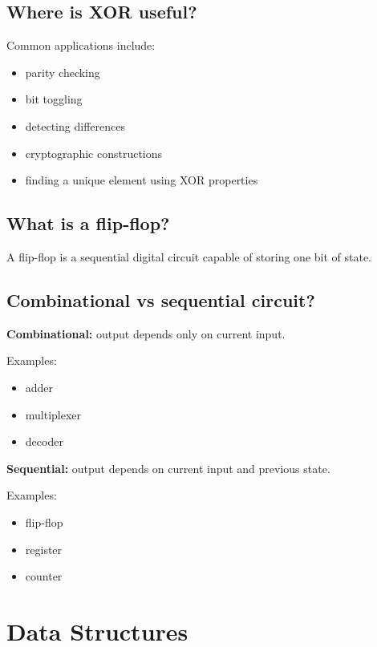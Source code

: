 \medskip

\subsection{Where is XOR useful?}

Common applications include:

\begin{itemize}
  \item parity checking
  \item bit toggling
  \item detecting differences
  \item cryptographic constructions
  \item finding a unique element using XOR properties
\end{itemize}

\medskip

\subsection{What is a flip-flop?}

A flip-flop is a sequential digital circuit capable of storing one bit of state.

\medskip

\subsection{Combinational vs sequential circuit?}

\textbf{Combinational:} output depends only on current input.

Examples:

\begin{itemize}
  \item adder
  \item multiplexer
  \item decoder
\end{itemize}

\textbf{Sequential:} output depends on current input and previous state.

Examples:

\begin{itemize}
  \item flip-flop
  \item register
  \item counter
\end{itemize}

\medskip

\section{Data Structures}

